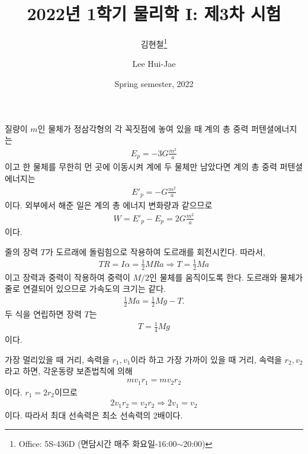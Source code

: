 \documentclass[floatfix,nofootinbib,superscriptaddress,fleqn]{revtex4-2}
\begin{document}
\title{\Large 2022년 1학기 물리학 I: 제3차 시험}
\author{김현철\footnote{Office: 5S-436D (면담시간 매주
    화요일-16:00$\sim$20:00)}} 
\author{Lee Hui-Jae} 
\date{Spring semester, 2022}


\maketitle
 
질량이 $m$인 물체가 정삼각형의 각 꼭짓점에 놓여 있을 때 계의 총 중력 퍼텐셜에너지는
\begin{align}
  E_p =-3G\frac{m^2}{a}
\end{align} 
이고 한 물체를 무한히 먼 곳에 이동시켜 계에 두 물체만 남았다면 계의 총 중력 퍼텐셜에너지는
\begin{align}
  E'_p = -G\frac{m^2}{a}
\end{align}
이다. 외부에서 해준 일은 계의 총 에너지 변화량과 같으므로
\begin{align}
  W = E'_p - E_p = 2G\frac{m^2}{a}
\end{align}
이다.
\vspace{0.5cm}
 

\vspace{0.5cm} 
줄의 장력 $T$가 도르래에 돌림힘으로 작용하여 도르래를 회전시킨다. 따라서,
\begin{align}
  TR = I\alpha = \frac{1}{2}MRa \Longrightarrow T =\frac{1}{2}Ma
\end{align}    
이고 장력과 중력이 작용하여 중력이 $M/2$인 물체를 움직이도록 한다.
도르래와 물체가 줄로 연결되어 있으므로 가속도의 크기는 같다.
\begin{align}
  \frac{1}{2}Ma = \frac{1}{2}Mg - T.
\end{align}
두 식을 연립하면 장력 $T$는
\begin{align}
  T = \frac{1}{4}Mg
\end{align}
이다.

 

\vspace{0.5cm} 
가장 멀리있을 때 거리, 속력을 $r_1, v_1$이라 하고
가장 가까이 있을 때 거리, 속력을 $r_2, v_2$라고 하면,
각운동량 보존법칙에 의해 
\begin{align}
  mv_1r_1 = mv_2r_2
\end{align}
이다. $r_1 = 2r_2$이므로
\begin{align}
  2v_1r_2 = v_2r_2\Longrightarrow 2v_1 = v_2
\end{align}
이다. 따라서 최대 선속력은 최소 선속력의 2배이다.
\vspace{0.5cm}
 
\end{document}
